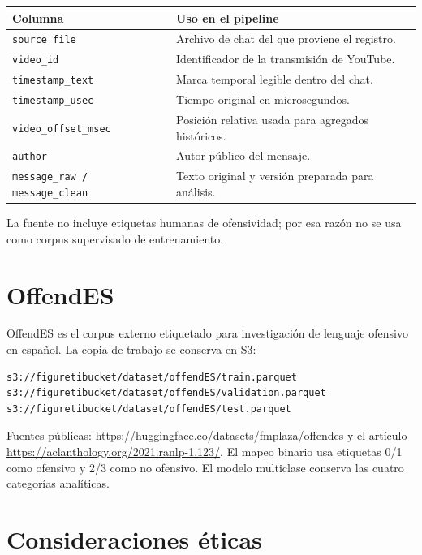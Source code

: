 \documentclass[11pt,a4paper,openany]{report}
\newcommand{\topic}[1]{\texttt{#1}}
\begin{document}
\begin{center}
\small
\begin{tabularx}{0.94\textwidth}{p{4.1cm}Y}
\toprule
\textbf{Columna} & \textbf{Uso en el pipeline}\\
\midrule
\topic{source\_file} & Archivo de chat del que proviene el registro.\\
\topic{video\_id} & Identificador de la transmisión de YouTube.\\
\topic{timestamp\_text} & Marca temporal legible dentro del chat.\\
\topic{timestamp\_usec} & Tiempo original en microsegundos.\\
\topic{video\_offset\_msec} & Posición relativa usada para agregados históricos.\\
\topic{author} & Autor público del mensaje.\\
\topic{message\_raw / message\_clean} & Texto original y versión preparada para análisis.\\
\bottomrule
\end{tabularx}
\normalsize
\end{center}

La fuente no incluye etiquetas humanas de ofensividad; por esa razón no se usa como corpus supervisado de entrenamiento.

\section{OffendES}

OffendES es el corpus externo etiquetado para investigación de lenguaje ofensivo en español. La copia de trabajo se conserva en S3:

\begin{lstlisting}
s3://figuretibucket/dataset/offendES/train.parquet
s3://figuretibucket/dataset/offendES/validation.parquet
s3://figuretibucket/dataset/offendES/test.parquet
\end{lstlisting}

Fuentes públicas: \url{https://huggingface.co/datasets/fmplaza/offendes} y el artículo \url{https://aclanthology.org/2021.ranlp-1.123/}. El mapeo binario usa etiquetas 0/1 como ofensivo y 2/3 como no ofensivo. El modelo multiclase conserva las cuatro categorías analíticas.

\section{Consideraciones éticas}
\end{document}
